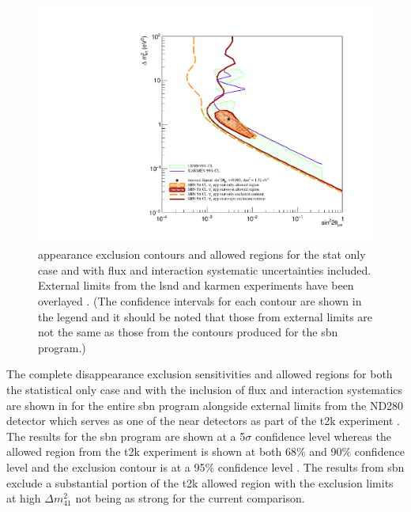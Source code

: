 \begin{figure}[h!]
    \centering
    \includegraphics[width = \largefigwidth]{figures-chap6/overlays/valor_overlays_nue_app.pdf}
    \caption[\nue appearance contours with external limits.]{\nue appearance exclusion contours and allowed regions for the stat only case and with flux and interaction systematic uncertainties included. External limits from the \gls{lsnd} and \gls{karmen} experiments have been overlayed \cite{LSND_KARMEN_nue_app_contour}. (The confidence intervals for each contour are shown in the legend and it should be noted that those from external limits are not the same as those from the contours produced for the \gls{sbn} program.)}
    \label{fig:nue_app_global_sensitivity}
\end{figure}

The complete \nue disappearance exclusion sensitivities and allowed regions for both the statistical only case and with the inclusion of flux and interaction systematics are shown in  for the entire \gls{sbn} program alongside external limits from the ND280 detector which serves as one of the near detectors as part of the \gls{t2k} experiment \cite{t2k_experiment}. The results for the \gls{sbn} program are shown at a 5$\sigma$ confidence level whereas the allowed region from the \gls{t2k} experiment is shown at both 68\% and 90\% confidence level and the exclusion contour is at a 95\% confidence level \cite{T2K_nue_disapp_contour}. The results from \gls{sbn} exclude a substantial portion of the \gls{t2k} allowed region with the exclusion limits at high $\Delta m^2_{41}$ not being as strong for the current comparison. 

